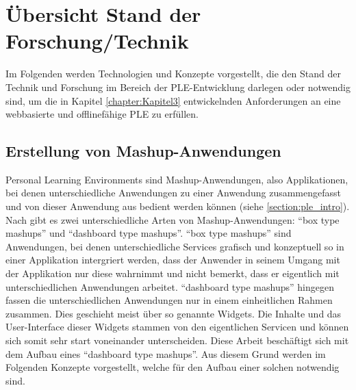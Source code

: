 \chapter{Übersicht Stand der Forschung/Technik} 
\label{chapter:Kapitel4}

Im Folgenden werden Technologien und Konzepte vorgestellt, die den Stand der Technik und Forschung im Bereich der PLE-Entwicklung darlegen oder notwendig sind, um die in Kapitel \ref{chapter:Kapitel3} entwickelnden Anforderungen an eine webbasierte und offlinefähige PLE zu erfüllen.

\section{Erstellung von Mashup-Anwendungen}
Personal Learning Environments sind Mashup-Anwendungen, also Applikationen, bei denen unterschiedliche Anwendungen zu einer Anwendung zusammengefasst und von dieser Anwendung aus bedient werden können (siehe \ref{section:ple_intro}). Nach \cite{Soylu2011} gibt es zwei unterschiedliche Arten von Mashup-Anwendungen: "`box type mashups"' und "`dashboard type mashups"'. "`box type mashups"' sind Anwendungen, bei denen unterschiedliche Services grafisch und konzeptuell so in einer Applikation intergriert werden, dass der Anwender in seinem Umgang mit der Applikation nur diese wahrnimmt und nicht bemerkt, dass er eigentlich mit unterschiedlichen Anwendungen arbeitet. "`dashboard type mashups"' hingegen fassen die unterschiedlichen Anwendungen nur in einem einheitlichen Rahmen zusammen. Dies geschieht meist über so genannte Widgets. Die Inhalte und das User-Interface dieser Widgets stammen von den eigentlichen Servicen und können sich somit sehr start voneinander unterscheiden. Diese Arbeit beschäftigt sich mit dem Aufbau eines "`dashboard type mashups"'. Aus diesem Grund werden im Folgenden Konzepte vorgestellt, welche für den Aufbau einer solchen notwendig sind. 

